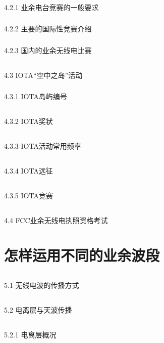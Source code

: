 \documentclass[12pt,UTF8]{ctexbook}
\begin{document}
\subsection{}4.2.1 业余电台竞赛的一般要求
\subsection{}4.2.2 主要的国际性竞赛介绍
\subsection{}4.2.3 国内的业余无线电比赛
\section{}4.3 IOTA“空中之岛”活动
\subsection{}4.3.1 IOTA岛屿编号
\section{}4.3.2 IOTA奖状
\section{}4.3.3 IOTA活动常用频率
\section{}4.3.4 IOTA远征
\section{}4.3.5 IOTA竞赛
\section{}4.4 FCC业余无线电执照资格考试

\chapter{怎样运用不同的业余波段}

\section{}5.1 无线电波的传播方式
\section{}5.2 电离层与天波传播
\section{}5.2.1 电离层概况
\end{document}
